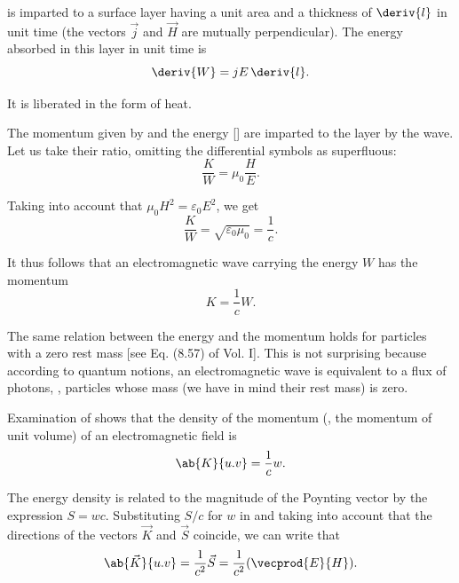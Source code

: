 \noindent
is imparted to a surface layer having a unit area and a thickness of $\deriv{l}$ in unit time (the vectors $\vec{j}$ and $\vec{H}$ are mutually perpendicular).
The energy absorbed in this layer in unit time is
\begin{equation}\label{eq:15_34}
    \deriv{W} = jE\, \deriv{l}.
\end{equation}

\noindent
It is liberated in the form of heat.

The momentum given by  and the energy [] are imparted to the layer by the wave.
Let us take their ratio, omitting the differential symbols as superfluous:
\begin{equation*}
    \frac{K}{W} = \mu_0 \frac{H}{E}.
\end{equation*}

\noindent
Taking into account that $\mu_0 H^2=\varepsilon_0 E^2$, we get
\begin{equation*}
    \frac{K}{W} = \sqrt{\varepsilon_0\mu_0} = \frac{1}{c}.
\end{equation*}

\noindent
It thus follows that an electromagnetic wave carrying the energy $W$ has the momentum
\begin{equation}\label{eq:15_35}
    K = \frac{1}{c} W.
\end{equation}

\noindent
The same relation between the energy and the momentum holds for particles with a zero rest mass [see Eq. (8.57) of Vol. I].
This is not surprising because according to quantum notions, an electromagnetic wave is equivalent to a flux of photons, \ie, particles whose mass (we have in mind their rest mass) is zero.

Examination of  shows that the density of the momentum (\ie, the momentum of unit volume) of an electromagnetic field is
\begin{equation}\label{eq:15_36}
    \ab{K}{u.v} = \frac{1}{c} w.
\end{equation}

\noindent
The energy density is related to the magnitude of the Poynting vector by the expression $S = wc$. Substituting $S/c$ for $w$ in  and taking into account that the directions of the vectors $\vec{K}$ and $\vec{S}$ coincide, we can write that
\begin{equation}\label{eq:15_37}
    \ab{\vec{K}}{u.v} = \frac{1}{c^2} \vec{S} = \frac{1}{c^2} (\vecprod{E}{H}).
\end{equation}


